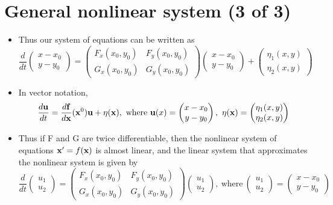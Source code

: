 \documentclass[11pt,a4paper]{article}
\begin{document}
	\section*{General nonlinear system (3 of 3)}
	\begin{itemize}
		\item Thus our system of equations can be written as
		$$
		\frac{d}{dt}
		\begin{pmatrix}
			x-x_0\\
			y-y_0
		\end{pmatrix}=
		\begin{pmatrix}
			F_x(x_0, y_0) & F_y(x_0, y_0)\\
			G_x(x_0, y_0) & G_y(x_0, y_0)
		\end{pmatrix}
		\begin{pmatrix}
			x-x_0\\
			y-y_0
		\end{pmatrix} +
		\begin{pmatrix}
			\eta_1(x,y)\\
			\eta_2(x,y)
		\end{pmatrix}
		$$
		\item In vector notation,
		$$
		\frac{d \vb{u}}{dt} = \frac{d \vb{f}}{d \vb{x}}(\vb{x}^0)\vb{u} + \vb{\eta(\vb{x})},\ \text{where}\ \vb{u}(x) =
		\begin{pmatrix}
			x-x_0\\
			y-y_0
		\end{pmatrix},\ \eta(\vb{x}) =
		\begin{pmatrix}
			\eta_1(x,y)\\
			\eta_2(x,y)
		\end{pmatrix}
		$$
		\item Thus if F and G are twice differentiable, then the nonlinear system of equations $\vb{x}^\prime = f(\vb{x})$ is almost linear, and the linear system that approximates the nonlinear system is given by
		$$
		\frac{d}{dt}
		\begin{pmatrix}
			u_1\\
			u_2
		\end{pmatrix}=
		\begin{pmatrix}
			F_x(x_0, y_0) & F_y(x_0,y_0)\\
			G_x(x_0,y_0) & G_y(x_0,y_0)
		\end{pmatrix}
		\begin{pmatrix}
			u_1\\
			u_2
		\end{pmatrix},\ \text{where}\ 
		\begin{pmatrix}
			u_1\\
			u_2
		\end{pmatrix}=
		\begin{pmatrix}
			x-x_0\\
			y-y_0
		\end{pmatrix}
		$$
	\end{itemize}
\end{document}
